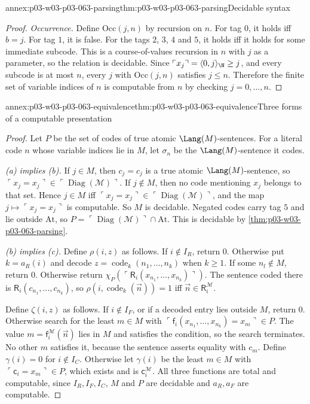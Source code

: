 \begin{annexitem}{annex:p03-w03-p03-063-parsing}{thm:p03-w03-p03-063-parsing}{Decidable syntax}
\begin{proof}
\emph{Occurrence.}  Define \(\mathrm{Occ}(j,n)\) by recursion on \(n\).  For
tag \(0\), it holds iff \(b=j\).  For tag \(1\), it is false.  For the tags
\(2\), \(3\), \(4\) and \(5\), it holds iff it holds for some immediate
subcode.  This is a course-of-values recursion in \(n\) with \(j\) as a
parameter, so the relation is decidable.  Since
\(\ulcorner x_j\urcorner=\langle0,j\rangle_{\N}\geq j\), and every subcode is
at most \(n\), every \(j\) with \(\mathrm{Occ}(j,n)\) satisfies \(j\leq n\).
Therefore the finite set of variable indices of \(n\) is computable from
\(n\) by checking \(j=0,\ldots,n\).
\end{proof}
\end{annexitem}

\begin{annexitem}{annex:p03-w03-p03-063-equivalence}{thm:p03-w03-p03-063-equivalence}{Three forms of a computable presentation}
\begin{proof}
Let \(P\) be the set of codes of true atomic \(\Lang(M)\)-sentences.  For a
literal code \(n\) whose variable indices lie in \(M\), let \(\sigma_n\) be
the \(\Lang(M)\)-sentence it codes.

\emph{(a) implies (b).}  If \(j\in M\), then \(c_j=c_j\) is a true atomic
\(\Lang(M)\)-sentence, so
\(\ulcorner x_j=x_j\urcorner\in\ulcorner\operatorname{Diag}(\mathcal M)\urcorner\).
If \(j\notin M\), then no code mentioning \(x_j\) belongs to that set.  Hence
\(j\in M\) iff
\(\ulcorner x_j=x_j\urcorner\in\ulcorner\operatorname{Diag}(\mathcal M)\urcorner\),
and the map \(j\mapsto\ulcorner x_j=x_j\urcorner\) is computable.  So \(M\)
is decidable.  Negated codes carry tag \(5\) and lie outside \(\mathrm{At}\),
so \(P=\ulcorner\operatorname{Diag}(\mathcal M)\urcorner\cap\mathrm{At}\).
This is decidable by \cref{thm:p03-w03-p03-063-parsing}.

\emph{(b) implies (c).}  Define
\(\rho(i,z)\) as follows.  If \(i\notin I_R\), return \(0\).  Otherwise put
\(k=a_R(i)\) and decode \(z=\operatorname{code}_k(n_1,\ldots,n_k)\) when
\(k\geq1\).  If some \(n_l\notin M\), return \(0\).  Otherwise return
\(\chi_P(\ulcorner\mathsf R_i(x_{n_1},\ldots,x_{n_k})\urcorner)\).  The
sentence coded there is \(\mathsf R_i(c_{n_1},\ldots,c_{n_k})\), so
\(\rho(i,\operatorname{code}_k(\vec n))=1\) iff
\(\vec n\in\mathsf R_i^{\mathcal M}\).

Define \(\zeta(i,z)\) as follows.  If \(i\notin I_F\), or if a decoded entry
lies outside \(M\), return \(0\).  Otherwise search for the least \(m\in M\)
with
\(\ulcorner\mathsf f_i(x_{n_1},\ldots,x_{n_k})=x_m\urcorner\in P\).  The
value \(m=\mathsf f_i^{\mathcal M}(\vec n)\) lies in \(M\) and satisfies the
condition, so the search terminates.  No other \(m\) satisfies it, because
the sentence asserts equality with \(c_m\).  Define \(\gamma(i)=0\) for
\(i\notin I_C\).  Otherwise let \(\gamma(i)\) be the least \(m\in M\) with
\(\ulcorner\mathsf c_i=x_m\urcorner\in P\), which exists and is
\(\mathsf c_i^{\mathcal M}\).  All three functions are total and computable,
since \(I_R,I_F,I_C\), \(M\) and \(P\) are decidable and \(a_R,a_F\) are
computable.


\end{proof}
\end{annexitem}
